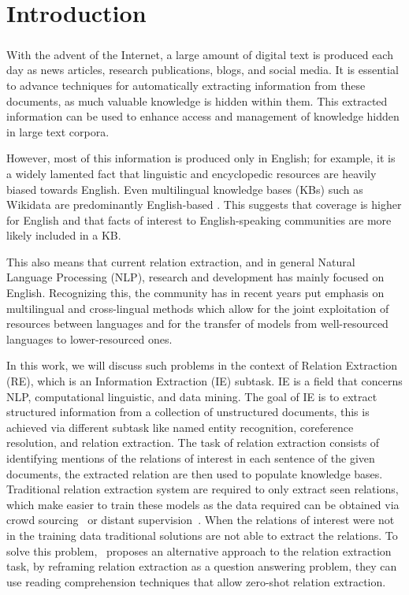 \chapter{Introduction}
\paragraph{}

With the advent of the Internet, a large amount of digital text is produced each day as news articles, research publications, blogs, and social media. It is essential to advance techniques for automatically extracting information from these documents, as much valuable knowledge is hidden within them. This extracted information can be used to enhance access and management of knowledge hidden in large text corpora. 

However, most of this information is produced only in English; for example, it is a widely lamented fact that linguistic and encyclopedic resources are heavily biased towards English. Even multilingual knowledge bases (KBs) such as Wikidata \citep{vwikidata} are predominantly English-based \citep{Kaffee:Simperl:18}. This suggests that coverage is higher for English and that facts of interest to English-speaking communities are more likely included in a KB.

This also means that current relation extraction, and in general Natural Language Processing (NLP), research and development has mainly focused on English. Recognizing this, the community has in recent years put emphasis on multilingual and cross-lingual methods which allow for the joint exploitation of resources between languages and for the transfer of models from well-resourced languages to lower-resourced ones.

In this work, we will discuss such problems in the context of Relation Extraction (RE), which is an Information Extraction (IE) subtask. IE is a field that concerns NLP, computational linguistic, and data mining. The goal of IE is to extract structured information from a collection of unstructured documents, this is achieved via different subtask like named entity recognition, coreference resolution, and relation extraction. The task of relation extraction consists of identifying mentions of the relations of interest in each sentence of the given documents, the extracted relation are then used to populate knowledge bases. Traditional relation extraction system are required to only extract seen relations, which make easier to train these models as the data required can be obtained via crowd sourcing~\citep{liu-etal-2016-effective} or distant supervision~\citep{hoffmann-etal-2011-knowledge}. When the relations of interest were not in the training data traditional solutions are not able to extract the relations. To solve this problem,~\cite{levy2017zero} proposes an alternative approach to the relation extraction task, by reframing relation extraction as a question answering problem, they can use reading comprehension techniques that allow zero-shot relation extraction. 

